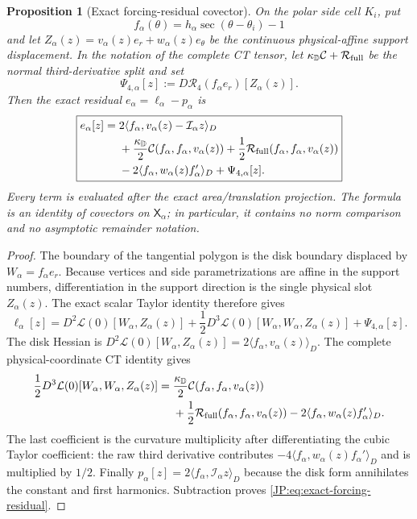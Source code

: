 \documentclass[11pt]{amsart}
\numberwithin{equation}{section}
\newtheorem{proposition}[theorem]{Proposition}
\theoremstyle{definition}
\theoremstyle{remark}
\begin{document}
\begin{proposition}[Exact forcing-residual covector]
\label{JP:prop:forcing-residual-split}
On the polar side cell $K_i$, put
\[
 f_\alpha(\theta)=h_\alpha\sec(\theta-\theta_i)-1
\]
and let
$Z_\alpha(z)=v_\alpha(z)e_r+w_\alpha(z)e_\theta$ be the continuous
physical-affine support displacement.  In the notation of the complete CT
tensor, let $\kappa_{\mathbb D}\mathcal C+\mathcal R_{\rm full}$ be the
normal third-derivative split and set
\[
 \Psi_{4,\alpha}[z]
 :=D\mathcal R_4(f_\alpha e_r)[Z_\alpha(z)].
\]
Then the exact residual $e_\alpha=\ell_\alpha-p_\alpha$ is
\begin{equation}\label{JP:eq:exact-forcing-residual}
\boxed{
\begin{aligned}
 e_\alpha[z]={}&
 2\langle f_\alpha,
       v_\alpha(z)-\mathcal I_\alpha z\rangle_D\\
 &+\frac{\kappa_{\mathbb D}}2
   \mathcal C(f_\alpha,f_\alpha,v_\alpha(z))
  +\frac12\mathcal R_{\rm full}
   (f_\alpha,f_\alpha,v_\alpha(z))\\
 &-2\langle f_\alpha,
       w_\alpha(z)f_\alpha'\rangle_D
  +\Psi_{4,\alpha}[z].
\end{aligned}}
\end{equation}
Every term is evaluated after the exact area/translation projection.  The
formula is an identity of covectors on $\mathsf X_\alpha$; in particular,
it contains no norm comparison and no asymptotic remainder notation.
\end{proposition}

\begin{proof}
The boundary of the tangential polygon is the disk boundary displaced by
$W_\alpha=f_\alpha e_r$.  Because vertices and side parametrizations are
affine in the support numbers, differentiation in the support direction is
the single physical slot $Z_\alpha(z)$.  The exact scalar Taylor identity
therefore gives
\[
 \ell_\alpha[z]
 =D^2\mathcal L(0)[W_\alpha,Z_\alpha(z)]
 +\frac12D^3\mathcal L(0)
       [W_\alpha,W_\alpha,Z_\alpha(z)]
 +\Psi_{4,\alpha}[z].
\]
The disk Hessian is
$D^2\mathcal L(0)[W_\alpha,Z_\alpha(z)]
=2\langle f_\alpha,v_\alpha(z)\rangle_D$.
The complete physical-coordinate CT identity gives
\[
\begin{aligned}
 \frac12D^3\mathcal L(0)
 [W_\alpha,W_\alpha,Z_\alpha(z)]
 ={}&\frac{\kappa_{\mathbb D}}2
   \mathcal C(f_\alpha,f_\alpha,v_\alpha(z))\\
 &+\frac12\mathcal R_{\rm full}
   (f_\alpha,f_\alpha,v_\alpha(z))
 -2\langle f_\alpha,w_\alpha(z)f_\alpha'\rangle_D.
\end{aligned}
\]
The last coefficient is the curvature multiplicity after differentiating
the cubic Taylor coefficient: the raw third derivative contributes
$-4\langle f_\alpha,w_\alpha(z)f_\alpha'\rangle_D$ and is multiplied by
$1/2$.  Finally
$p_\alpha[z]=2\langle f_\alpha,\mathcal I_\alpha z\rangle_D$ because the
disk form annihilates the constant and first harmonics.  Subtraction proves
\eqref{JP:eq:exact-forcing-residual}.
\end{proof}
\end{document}
